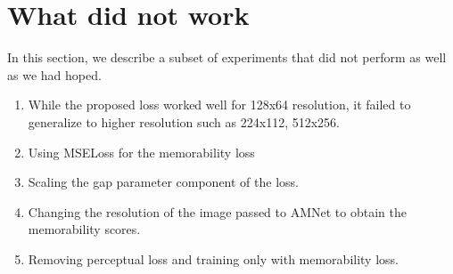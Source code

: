 \documentclass[10pt,twocolumn,letterpaper]{article}
\begin{document}

\section{What did not work}
In this section, we describe a subset of experiments that did not perform as well as we had hoped.
\begin{enumerate}
\setlength{\itemsep}{1pt}
\item While the proposed loss worked well for 128x64 resolution, it failed to generalize to higher resolution such as 224x112, 512x256. 
\item Using MSELoss for the memorability loss
\item Scaling the gap parameter component of the loss.
\item Changing the resolution of the image passed to AMNet to obtain the memorability scores.
\item Removing perceptual loss and training only with memorability loss.
\end{enumerate}
\end{document}
